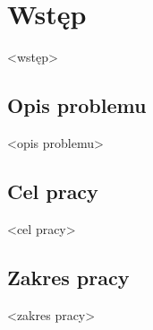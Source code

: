 \chapter*{Wstęp}

<wstęp>

\section*{Opis problemu}

<opis problemu>

\section*{Cel pracy}

<cel pracy>

\section*{Zakres pracy}

<zakres pracy>
